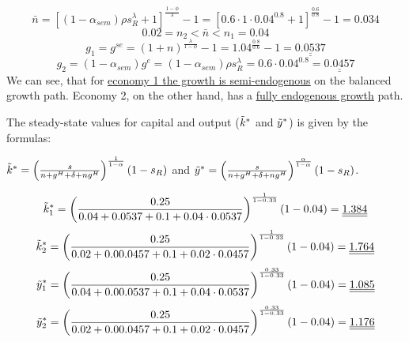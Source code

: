 \documentclass[11pt]{article} %
\begin{document}
\begin{equation}
    \bar n = \left[(1-\alpha_{sem})\rho s_R^\lambda +1\right]^{\frac{1-\phi}{\lambda}}-1 = \left[0.6\cdot 1\cdot 0.04^0.8 +1\right]^{\frac{0.6}{0.8}}-1 = 0.034
\end{equation}
\begin{equation}
    0.02 = n_2 < \bar n < n_1 = 0.04
\end{equation}
\begin{equation}
    g_1 = g^{se} = (1+n)^{\frac{\lambda}{1-\phi}}-1 = 1.04^{\frac{0.8}{0.6}}-1 = \underline{\underline{0.0537}}
\end{equation}
\begin{equation}
    g_2 = (1-\alpha_{sem})g^{e} = (1-\alpha_{sem})\rho s_R^\lambda = 0.6\cdot 0.04^{0.8} = \underline{\underline{0.0457}}
\end{equation}
We can see, that for \underline{\underline{economy 1 the growth is semi-endogenous}} on the balanced growth path. Economy 2, on the other hand, has a \underline{\underline{fully endogenous growth}} path.\par

The steady-state values for capital and output ($\Tilde{k}^*$ and $\Tilde{y}^*$) is given by the formulas:
\begin{center}
    $\Tilde{k}^* = \left(\frac{s}{n+g^H+\delta+ng^H}\right)^{\frac{1}{1-\alpha}}(1-s_R)$ and $\Tilde{y}^* = \left(\frac{s}{n+g^H+\delta+ng^H}\right)^{\frac{\alpha}{1-\alpha}}(1-s_R)$.
\end{center}
\begin{equation}
    \Tilde{k}^*_1 = \left(\frac{0.25}{0.04+0.0537+0.1+0.04\cdot0.0537}\right)^{\frac{1}{1-0.33}}(1-0.04) = \underline{\underline{1.384}}
\end{equation}
\begin{equation}
    \Tilde{k}^*_2 = \left(\frac{0.25}{0.02+0.00.0457+0.1+0.02\cdot0.0457}\right)^{\frac{1}{1-0.33}}(1-0.04) = \underline{\underline{1.764}}
\end{equation}
\begin{equation}
    \Tilde{y}^*_1 = \left(\frac{0.25}{0.04+0.00.0537+0.1+0.04\cdot0.0537}\right)^{\frac{0.33}{1-0.33}}(1-0.04) = \underline{\underline{1.085}}
\end{equation}
\begin{equation}
    \Tilde{y}^*_2 = \left(\frac{0.25}{0.02+0.00.0457+0.1+0.02\cdot0.0457}\right)^{\frac{0.33}{1-0.33}}(1-0.04) = \underline{\underline{1.176}}
\end{equation}
\end{document}
